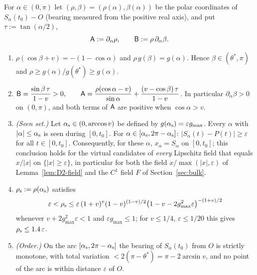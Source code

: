 \begin{lemma}\label{lem:ST-front}
For $\alpha\in(0,\pi)$ let $(\rho,\beta)=(\rho(\alpha),\beta(\alpha))$ be the polar coordinates of $S_\alpha(t_0)-O$ (bearing measured from
the positive real axis), and put $\tau:=\tan(\alpha/2)$,
\[
\mathsf A:=\partial_\alpha\rho,\qquad\mathsf B:=\rho\,\partial_\alpha\beta .
\]
\begin{enumerate}
\item[(a)] $\rho(\cos\beta+v)=-(1-\cos\alpha)$ and $\rho\,g(\beta)=g(\alpha)$. Hence $\beta\in(\theta^*,\pi)$ and
$\rho\ge g(\alpha)/g(\theta^*)\ge g(\alpha)$.
\item[(b)] $\displaystyle\mathsf B=\frac{\sin\beta\,\tau}{1-v}>0,\qquad\mathsf A=\frac{\rho(\cos\alpha-v)}{\sin\alpha}+\frac{(v-\cos\beta)\,\tau}{1-v}$.
In particular $\partial_\alpha\beta>0$ on $(0,\pi)$, and both terms of $\mathsf A$ are positive when $\cos\alpha>v$.
\item[(e)] \emph{(Seen set.)} Let $\alpha_{\mathrm s}\in(0,\arccos v)$ be defined by $g(\alpha_{\mathrm s})=\varepsilon g_{\max}$. Every $\alpha$ with
$|\alpha|\le\alpha_{\mathrm s}$ is seen during $[0,t_0]$. For $\alpha\in[\alpha_{\mathrm s},2\pi-\alpha_{\mathrm s}]$: $|S_\alpha(t)-P(t)|\ge\varepsilon$ for all
$t\in[0,t_0]$. Consequently, for these $\alpha$, $x_\alpha=S_\alpha$ on $[0,t_0]$; this conclusion holds for the virtual candidates
of \emph{every} Lipschitz field that equals $x/|x|$ on $\{|x|\ge\varepsilon\}$, in particular for both the field $x/\max(|x|,\varepsilon)$
of Lemma~\ref{lem:D2-field} and the $C^1$ field $F$ of Section~\ref{sec:bulk}.
\item[(f)] $\rho_{\mathrm s}:=\rho(\alpha_{\mathrm s})$ satisfies
\[
\varepsilon<\rho_{\mathrm s}\le\varepsilon\,(1+v)^v(1-v)^{(1-v)/2}\bigl(1-v-2g_{\max}^2\varepsilon\bigr)^{-(1+v)/2}
\]
whenever $v+2g_{\max}^2\varepsilon<1$ and $\varepsilon g_{\max}\le1$; for $v\le1/4$, $\varepsilon\le1/20$ this gives
$\rho_{\mathrm s}\le1.4\,\varepsilon$.
\item[(g)] \emph{(Order.)} On the arc $[\alpha_{\mathrm s},2\pi-\alpha_{\mathrm s}]$ the bearing of $S_\alpha(t_0)$ from $O$ is strictly monotone, with total
variation $<2(\pi-\theta^*)=\pi-2\arcsin v$, and no point of the arc is within distance $\varepsilon$ of $O$.
\end{enumerate}
\end{lemma}
